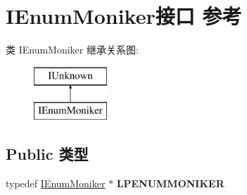 \hypertarget{interface_i_enum_moniker}{}\section{I\+Enum\+Moniker接口 参考}
\label{interface_i_enum_moniker}
类 I\+Enum\+Moniker 继承关系图\+:\begin{figure}[H]
\begin{center}
\leavevmode
\includegraphics[height=2.000000cm]{interface_i_enum_moniker}
\end{center}
\end{figure}
\subsection*{Public 类型}
\begin{DoxyCompactItemize}
\item 
\mbox{\label{interface_i_enum_moniker_aa94c75ffa7042ab9f974a3928989c982}} 
typedef \hyperlink{interface_i_enum_moniker}{I\+Enum\+Moniker} $\ast$ {\bfseries L\+P\+E\+N\+U\+M\+M\+O\+N\+I\+K\+ER}
\end{DoxyCompactItemize}

